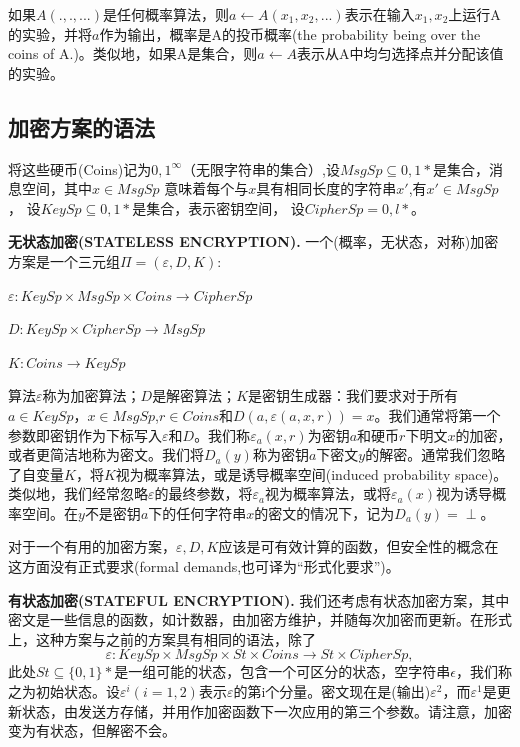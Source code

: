 \documentclass[]{article}
\begin{document}
如果$A(.,.,...)$是任何概率算法，则$a\leftarrow A(x_1,x_2,...)$表示在输入$x_1,x_2$上运行A的实验，并将$a$作为输出，概率是A的投币概率(the probability being over the coins of A.)。类似地，如果A是集合，则$a\leftarrow A$表示从A中均匀选择点并分配该值的实验。

\subsection{加密方案的语法}
将这些硬币(Coins)记为${0,1}^\infty$（无限字符串的集合）,设$MsgSp\subseteq {0,1}*$是集合，消息空间，其中$x\in MsgSp$ 意味着每个与$x$具有相同长度的字符串$x'$,有$x'\in MsgSp$， 设$KeySp\subseteq {0,1}*$是集合，表示密钥空间， 设$CipherSp={0,l}*$。
\par

 \textbf{\large{无状态加密(STATELESS ENCRYPTION).}} 一个(概率，无状态，对称)加密方案是一个三元组$\Pi=(\varepsilon,D,K)$:\par
 
$\varepsilon : KeySp\times MsgSp \times Coins\rightarrow CipherSp$\par
$D : KeySp\times CipherSp \rightarrow MsgSp$\par
$K :  Coins\rightarrow KeySp$\par

算法$\varepsilon$称为加密算法；$D$是解密算法；$K$是密钥生成器：我们要求对于所有$a\in KeySp$，$x\in MsgSp$,$r\in Coins$和$D(a,\varepsilon(a,x,r))=x$。我们通常将第一个参数即密钥作为下标写入$\varepsilon$和$D$。我们称$\varepsilon_a(x,r)$为密钥$a$和硬币$r$下明文$x$的加密，或者更简洁地称为密文。我们将$D_a(y)$称为密钥$a$下密文$y$的解密。通常我们忽略了自变量$K$，将$K$视为概率算法，或是诱导概率空间(induced probability space)。类似地，我们经常忽略$\varepsilon$的最终参数，将$\varepsilon_a$视为概率算法，或将$\varepsilon_a(x)$视为诱导概率空间。在$y$不是密钥$a$下的任何字符串$x$的密文的情况下，记为$D_a(y)=\perp$。
\par

对于一个有用的加密方案，$\varepsilon,D,K$应该是可有效计算的函数，但安全性的概念在这方面没有正式要求(formal demands,也可译为“形式化要求”)。\par

 \textbf{\large{有状态加密(STATEFUL ENCRYPTION).}}
 我们还考虑有状态加密方案，其中密文是一些信息的函数，如计数器，由加密方维护，并随每次加密而更新。在形式上，这种方案与之前的方案具有相同的语法，除了
 \[\varepsilon:KeySp \times MsgSp \times St \times Coins\rightarrow St \times CipherSp,\]
此处$St\subseteq \{0,1\}*$是一组可能的状态，包含一个可区分的状态，空字符串$\epsilon$，我们称之为初始状态。设$\varepsilon^i(i=1,2)$表示$\varepsilon$的第i个分量。密文现在是(输出)$\varepsilon^2$，而$\varepsilon^1$是更新状态，由发送方存储，并用作加密函数下一次应用的第三个参数。请注意，加密变为有状态，但解密不会。
\par
\end{document}
